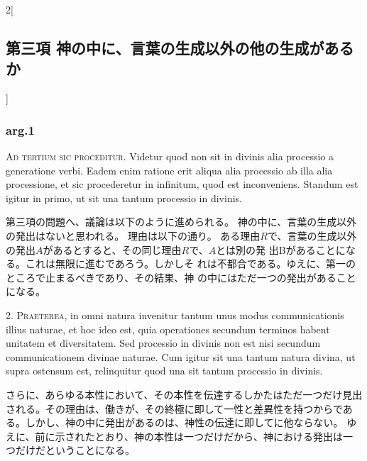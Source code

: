 \documentclass[paper=a4paper,fontsize=10pt,jafontsize=9pt,titlepage]{jlreq}
\begin{document}


\begin{paracol}{2}[\subsection{第三項 神の中に、言葉の生成以外の他の生成があるか}]

\subsubsection{arg.1}

{\scshape Ad tertium sic proceditur}. Videtur quod non sit in divinis alia
processio a generatione verbi. Eadem enim ratione erit aliqua alia
processio ab illa alia processione, et sic procederetur in infinitum,
quod est inconveniens. Standum est igitur in primo, ut sit una tantum
processio in divinis.


\switchcolumn


第三項の問題へ、議論は以下のように進められる。
神の中に、言葉の生成以外の発出はないと思われる。
理由は以下の通り。
ある理由$R$で、言葉の生成以外の発出$A$があるとすると、その同じ理由$R$で、$A$とは別の発
 出Bがあることになる。これは無限に進むであろう。しかしそ
 れは不都合である。ゆえに、第一のところで止まるべきであり、その結果、神
 の中にはただ一つの発出があることになる。




2. {\scshape Praeterea}, in omni natura invenitur tantum unus modus communicationis
illius naturae, et hoc ideo est, quia operationes secundum terminos
habent unitatem et diversitatem. Sed processio in divinis non est nisi
secundum communicationem divinae naturae. Cum igitur sit una tantum
natura divina, ut supra ostensum est, relinquitur quod una sit tantum
processio in divinis.


\switchcolumn


さらに、あらゆる本性において、その本性を伝達するしかたはただ一つだけ見出
 される。その理由は、働きが、その終極に即して一性と差異性を持つからであ
 る。しかし、神の中に発出があるのは、神性の伝達に即してに他ならない。
ゆえに、前に示されたとおり、神の本性は一つだけだから、神における発出は一
 つだけだということになる。





\end{paracol}
\end{document}
